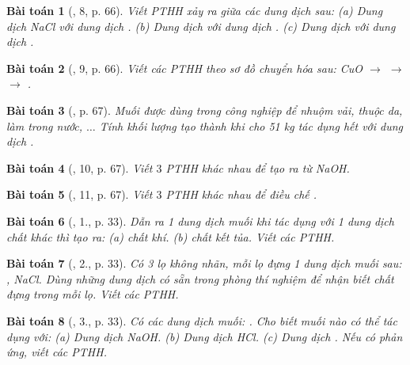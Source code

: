 \documentclass{article}
\newtheorem{baitoan}{Bài toán}
\begin{document}
\begin{baitoan}[\cite{SGK_KHTN_8_Canh_Dieu}, 8, p. 66]
	Viết PTHH xảy ra giữa các dung dịch sau: (a) Dung dịch \emph{NaCl} với dung dịch \emph{}. (b) Dung dịch \emph{} với dung dịch \emph{}. (c) Dung dịch \emph{} với dung dịch \emph{}.
\end{baitoan}

\begin{baitoan}[\cite{SGK_KHTN_8_Canh_Dieu}, 9, p. 66]
	Viết các PTHH theo sơ đồ chuyển hóa sau: \emph{CuO $\to$  $\to$  $\to$ }.
\end{baitoan}

\begin{baitoan}[\cite{SGK_KHTN_8_Canh_Dieu}, p. 67]
	Muối \emph{} được dùng trong công nghiệp để nhuộm vải, thuộc da, làm trong nước, $\ldots$ Tính khối lượng \emph{} tạo thành khi cho \emph{51 kg } tác dụng hết với dung dịch \emph{}.
\end{baitoan}

\begin{baitoan}[\cite{SGK_KHTN_8_Canh_Dieu}, 10, p. 67]
	Viết $3$ PTHH khác nhau để tạo ra \emph{} từ \emph{NaOH}.
\end{baitoan}

\begin{baitoan}[\cite{SGK_KHTN_8_Canh_Dieu}, 11, p. 67]
	Viết $3$ PTHH khác nhau để điều chế \emph{}.
\end{baitoan}

\begin{baitoan}[\cite{SGK_Hoa_Hoc_9}, 1., p. 33]
	Dẫn ra 1 dung dịch muối khi tác dụng với 1 dung dịch chất khác thì tạo ra: (a) chất khí. (b) chất kết tủa. Viết các PTHH.
\end{baitoan}

\begin{baitoan}[\cite{SGK_Hoa_Hoc_9}, 2., p. 33]
	Có 3 lọ không nhãn, mỗi lọ đựng 1 dung dịch muối sau: \emph{, NaCl}. Dùng những dung dịch có sẵn trong phòng thí nghiệm để nhận biết chất đựng trong mỗi lọ. Viết các PTHH.
\end{baitoan}

\begin{baitoan}[\cite{SGK_Hoa_Hoc_9}, 3., p. 33]
	Có các dung dịch muối: \emph{}. Cho biết muối nào có thể tác dụng với: (a) Dung dịch \emph{NaOH}. (b) Dung dịch \emph{HCl}. (c) Dung dịch \emph{}. Nếu có phản ứng, viết các PTHH.
\end{baitoan}
\end{document}
